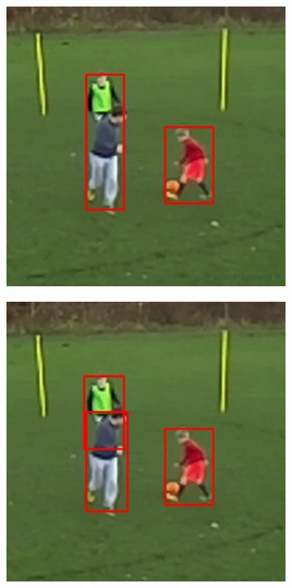 \documentclass{article}
\begin{document}
\begin{figure}[h!]
\begin{subfigure}[b]{0.5\linewidth}
	\includegraphics[scale=0.4]{report/pic/3_new/off_seq_5.jpg} 
  \end{subfigure}
  \begin{subfigure}[b]{0.5\linewidth}
  \centering
	\includegraphics[scale=0.4]{report/pic/3_new/on_seq_5.jpg} 
  \end{subfigure}
    \begin{subfigure}[b]{0.5\linewidth}
  \centering

\end{subfigure}
\end{figure}
\end{document}
